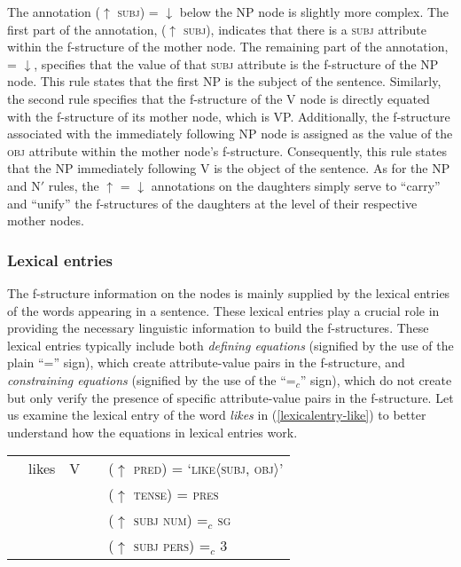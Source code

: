 The annotation ($\uparrow$ \textsc{subj}) = $\downarrow$ below the NP node is slightly more complex. The first part of the annotation, ($\uparrow$ \textsc{subj}), indicates that there is a \textsc{subj} attribute within the f-structure of the mother node. The remaining part of the annotation, = $\downarrow$, specifies that the value of that \textsc{subj} attribute is the f-structure of the NP node. This rule states that the first NP is the subject of the sentence.  Similarly, the second rule specifies that the f-structure of the V node is directly equated with the f-structure of its mother node, which is VP\@. Additionally, the f-structure associated with the immediately following NP node is assigned as the value of the \textsc{obj} attribute within the mother node's f-structure. Consequently, this rule states that the NP immediately following V is the object of the sentence. As for the NP and N$'$ rules, the $\uparrow$ = $\downarrow$ annotations on the daughters simply serve to ``carry'' and ``unify'' the f-structures of the daughters at the level of their respective mother nodes.

\subsubsection{Lexical entries}

The f-structure information on the nodes is mainly supplied by the lexical entries of the words appearing in a sentence. These lexical entries play a crucial role in providing the necessary linguistic information to build the f-structures. These lexical entries typically include both \textit{defining equations} (signified by the use of the plain ``='' sign), which create attribute-value pairs in the f-structure, and \textit{constraining equations} (signified by the use of the ``=$_c$'' sign), which do not create but only verify the presence of specific attribute-value pairs in the f-structure. Let us examine the lexical entry of the word \textit{likes} in (\ref{lexicalentry-like}) to better understand how the equations in lexical entries work.


\pex
\vspace{-13pt}

\label{lexicalentry-like}
\begin{tabular}{lllll}
	&	likes & V & & ($\uparrow$ \textsc{pred}) = `\textsc{like}$\langle$\textsc{subj, obj}$\rangle$' \\
	&& &  & ($\uparrow$ \textsc{tense}) = \textsc{pres} \\
	&&&&($\uparrow$ \textsc{subj} \textsc{num}) =$_c$ \textsc{sg}\\
	& & &  & ($\uparrow$ \textsc{subj} \textsc{pers}) =$_c$ 3 \\

\end{tabular}
\xe


